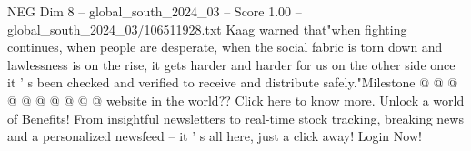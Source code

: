 \begin{textsample}{NEG Dim 8 – global\_south\_2024\_03 – Score 1.00 – global\_south\_2024\_03/106511928.txt}
Kaag warned that"when fighting continues, when people are desperate, when the social fabric is torn down and lawlessness is on the rise, it gets harder and harder for us on the other side once it ' s been checked and verified to receive and distribute safely."Milestone @ @ @ @ @ @ @ @ @ @ website in the world??
Click here to know more.
Unlock a world of Benefits!
From insightful newsletters to real-time stock tracking, breaking news and a personalized newsfeed -- it ' s all here, just a click away!
Login Now!

\end{textsample}
